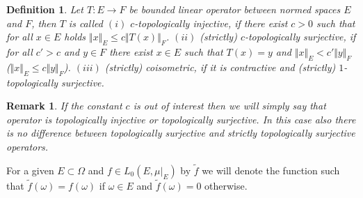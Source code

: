\documentclass[12pt]{article}
\newtheorem{remark}[theorem]{Remark}
\newtheorem{definition}[theorem]{Definition}
\begin{document}
\begin{definition}\label{DefNorOpType} Let $ T:E\to F$ be bounded linear
    operator between normed spaces $E$ and $F$, then $ T$ is called
    \newline
    $(i)$ \textit{$c$-topologically injective}, if there exist $c > 0$ such that
    for all $x \in E$ holds $\Vert x\Vert_E\leq c\Vert  T(x)\Vert_F$.
    \newline
    $(ii)$ \textit{(strictly) $c$-topologically surjective}, if for all $c'>c$
    and  $y\in F$ there exist $x \in E$ such that $ T(x) = y$ and 
    $\Vert x \Vert_E < c' \Vert y \Vert_F$ 
    ($\Vert x \Vert_E \leq c \Vert y \Vert_F$).
    \newline
    $(iii)$ (strictly) coisometric, if it is contractive and (strictly)
    $1$-topologically surjective.
\end{definition}

\begin{remark} If the constant $c$ is out of interest then we will simply say
    that operator is topologically injective or topologically surjective. In
    this case also there is no difference between topologically surjective and
    strictly topologically surjective operators.
\end{remark}

For a given $E\subset \Omega$ and $f\in L_0(E,\mu|_{E})$ by $\widetilde{f}$ we
will denote the function such that $\widetilde{f}(\omega)=f(\omega)$ if
$\omega\in E$ and $\widetilde{f}(\omega)=0$ otherwise.
\end{document}
